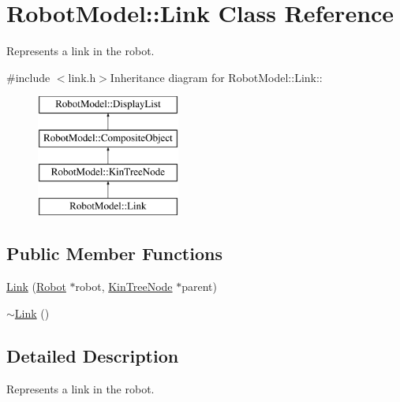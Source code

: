 \hypertarget{class_robot_model_1_1_link}{
\section{RobotModel::Link Class Reference}
\label{class_robot_model_1_1_link}
}


Represents a link in the robot.  


{\ttfamily \#include $<$link.h$>$}Inheritance diagram for RobotModel::Link::\begin{figure}[H]
\begin{center}
\leavevmode
\includegraphics[height=4cm]{class_robot_model_1_1_link}
\end{center}
\end{figure}
\subsection*{Public Member Functions}
\begin{DoxyCompactItemize}
\item 
\hyperlink{class_robot_model_1_1_link_adf46ff7e38787594ac9941a478083f21}{Link} (\hyperlink{class_robot_model_1_1_robot}{Robot} $\ast$robot, \hyperlink{class_robot_model_1_1_kin_tree_node}{KinTreeNode} $\ast$parent)
\item 
\hyperlink{class_robot_model_1_1_link_a666e442abb3122fe5eb1705f1b2d650d}{$\sim$Link} ()
\end{DoxyCompactItemize}


\subsection{Detailed Description}
Represents a link in the robot. 

